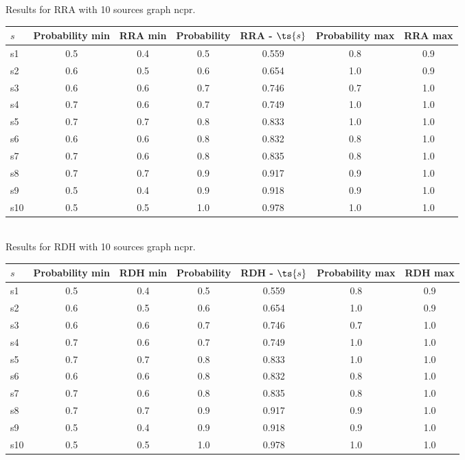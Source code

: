 \documentclass{article}
\begin{document}
\noindent Results for RRA with 10 sources graph ncpr.

\noindent\begin{tabular}{|l|c|c|c|c|c|c|}
\hline
$s$& Probability min & RRA min & Probability & RRA - $\ts{s}$ & Probability max & RRA max\\
\hline
s1 &0.5 & 0.4 & 0.5 & 0.559 & 0.8 & 0.9\\
\hline
s2 &0.6 & 0.5 & 0.6 & 0.654 & 1.0 & 0.9\\
\hline
s3 &0.6 & 0.6 & 0.7 & 0.746 & 0.7 & 1.0\\
\hline
s4 &0.7 & 0.6 & 0.7 & 0.749 & 1.0 & 1.0\\
\hline
s5 &0.7 & 0.7 & 0.8 & 0.833 & 1.0 & 1.0\\
\hline
s6 &0.6 & 0.6 & 0.8 & 0.832 & 0.8 & 1.0\\
\hline
s7 &0.7 & 0.6 & 0.8 & 0.835 & 0.8 & 1.0\\
\hline
s8 &0.7 & 0.7 & 0.9 & 0.917 & 0.9 & 1.0\\
\hline
s9 &0.5 & 0.4 & 0.9 & 0.918 & 0.9 & 1.0\\
\hline
s10 &0.5 & 0.5 & 1.0 & 0.978 & 1.0 & 1.0\\
\hline
\end{tabular}\\

\noindent Results for RDH with 10 sources graph ncpr.

\noindent\begin{tabular}{|l|c|c|c|c|c|c|}
\hline
$s$& Probability min & RDH min & Probability & RDH - $\ts{s}$ & Probability max & RDH max\\
\hline
s1 &0.5 & 0.4 & 0.5 & 0.559 & 0.8 & 0.9\\
\hline
s2 &0.6 & 0.5 & 0.6 & 0.654 & 1.0 & 0.9\\
\hline
s3 &0.6 & 0.6 & 0.7 & 0.746 & 0.7 & 1.0\\
\hline
s4 &0.7 & 0.6 & 0.7 & 0.749 & 1.0 & 1.0\\
\hline
s5 &0.7 & 0.7 & 0.8 & 0.833 & 1.0 & 1.0\\
\hline
s6 &0.6 & 0.6 & 0.8 & 0.832 & 0.8 & 1.0\\
\hline
s7 &0.7 & 0.6 & 0.8 & 0.835 & 0.8 & 1.0\\
\hline
s8 &0.7 & 0.7 & 0.9 & 0.917 & 0.9 & 1.0\\
\hline
s9 &0.5 & 0.4 & 0.9 & 0.918 & 0.9 & 1.0\\
\hline
s10 &0.5 & 0.5 & 1.0 & 0.978 & 1.0 & 1.0\\
\hline
\end{tabular}\\
\end{document}
